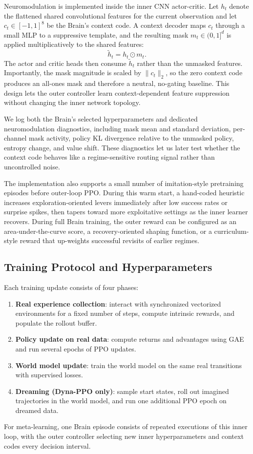 ﻿\documentclass[sigconf]{acmart}
\begin{document}
Neuromodulation is implemented inside the inner CNN actor-critic. Let $h_t$ denote the flattened shared convolutional features for the current observation and let $c_t \in [-1,1]^8$ be the Brain's context code. A context decoder maps $c_t$ through a small MLP to a suppressive template, and the resulting mask $m_t \in (0,1]^d$ is applied multiplicatively to the shared features:
\[
\tilde{h}_t = h_t \odot m_t.
\]
The actor and critic heads then consume $\tilde{h}_t$ rather than the unmasked features. Importantly, the mask magnitude is scaled by $\lVert c_t \rVert_2$, so the zero context code produces an all-ones mask and therefore a neutral, no-gating baseline. This design lets the outer controller learn context-dependent feature suppression without changing the inner network topology.

We log both the Brain's selected hyperparameters and dedicated neuromodulation diagnostics, including mask mean and standard deviation, per-channel mask activity, policy KL divergence relative to the unmasked policy, entropy change, and value shift. These diagnostics let us later test whether the context code behaves like a regime-sensitive routing signal rather than uncontrolled noise.

The implementation also supports a small number of imitation-style pretraining episodes before outer-loop PPO. During this warm start, a hand-coded heuristic increases exploration-oriented levers immediately after low success rates or surprise spikes, then tapers toward more exploitative settings as the inner learner recovers. During full Brain training, the outer reward can be configured as an area-under-the-curve score, a recovery-oriented shaping function, or a curriculum-style reward that up-weights successful revisits of earlier regimes.

\subsection{Training Protocol and Hyperparameters}
Each training update consists of four phases:
\begin{enumerate}
  \item \textbf{Real experience collection}: interact with synchronized vectorized environments for a fixed number of steps, compute intrinsic rewards, and populate the rollout buffer.
  \item \textbf{Policy update on real data}: compute returns and advantages using GAE and run several epochs of PPO updates.
  \item \textbf{World model update}: train the world model on the same real transitions with supervised losses.
  \item \textbf{Dreaming (Dyna-PPO only)}: sample start states, roll out imagined trajectories in the world model, and run one additional PPO epoch on dreamed data.
\end{enumerate}
For meta-learning, one Brain episode consists of repeated executions of this inner loop, with the outer controller selecting new inner hyperparameters and context codes every decision interval.
\end{document}
